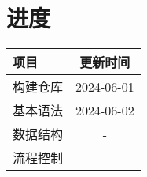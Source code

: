 \documentclass[a4paper,12pt]{article}
\begin{document}
    \section{进度}
        \begin{table}
        \centering
            \begin{tabular}{lc}
                项目                    &   更新时间 \\
                \hline
                构建仓库                &   2024-06-01 \\
                基本语法                &   2024-06-02 \\
                数据结构                &   - \\
                流程控制                &   - \\
            \end{tabular}
        \end{table}
\end{document}
